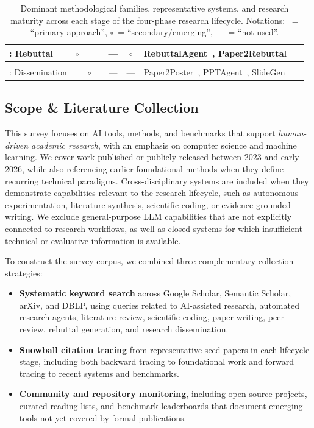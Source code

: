 \documentclass{llmxive}
\providecommand{\cmark}{\ding{51}}
\providecommand{\pmark}{$\circ$}
\providecommand{\xmark}{---}
\providecommand{\levelbadge}[2]{  \tcbox[on line, nobeforeafter, tcbox raise base,
         boxsep=0pt, left=2pt, right=2pt, top=0.5pt, bottom=0.5pt,
         arc=1.5pt, boxrule=0.3pt,
         colback=#1!15, colframe=#1!70]    {\scriptsize\bfseries\sffamily#2}}
\providecommand{\Sseven}{\texorpdfstring{\levelbadge{S7color}{S7}}{S7}\xspace}
\providecommand{\Seight}{\texorpdfstring{\levelbadge{S8color}{S8}}{S8}\xspace}
\begin{document}
\begin{table}[!t]
\begin{tabular}{l|ccccc|l|c}
\Sseven: Rebuttal           & \pmark & \cmark & \cmark & \xmark & \pmark & RebuttalAgent~\cite{rebuttalagent2026}, Paper2Rebuttal~\cite{paper2rebuttal2026}                                             &  \\
\midrule
\rowcolor{P4color!8}
\multicolumn{8}{l}{\textit{\textbf{Phase~4: Dissemination}}} \\
\Seight: Dissemination      & \cmark & \pmark & \cmark & \xmark & \xmark & Paper2Poster~\cite{paper2poster2025}, PPTAgent~\cite{pptagent2025}, SlideGen~\cite{slidegen2025}                             &  \\
\bottomrule
\end{tabular}
\caption{Dominant methodological families, representative systems, and research maturity across each stage of the four-phase research lifecycle. Notations: \cmark~= ``primary approach'', \pmark~= ``secondary/emerging'', \xmark~= ``not used''.}
\end{table}




\subsection{Scope \& Literature Collection}
\label{sec:scope}

This survey focuses on AI tools, methods, and benchmarks that support \emph{human-driven academic research}, with an emphasis on computer science and machine learning. We cover work published or publicly released between 2023 and early 2026, while also referencing earlier foundational methods when they define recurring technical paradigms. Cross-disciplinary systems are included when they demonstrate capabilities relevant to the research lifecycle, such as autonomous experimentation, literature synthesis, scientific coding, or evidence-grounded writing. We exclude general-purpose LLM capabilities that are not explicitly connected to research workflows, as well as closed systems for which insufficient technical or evaluative information is available.

To construct the survey corpus, we combined three complementary collection strategies:
\begin{itemize}
    \item \textbf{Systematic keyword search} across Google Scholar, Semantic Scholar, arXiv, and DBLP, using queries related to AI-assisted research, automated research agents, literature review, scientific coding, paper writing, peer review, rebuttal generation, and research dissemination.

    \item \textbf{Snowball citation tracing} from representative seed papers in each lifecycle stage, including both backward tracing to foundational work and forward tracing to recent systems and benchmarks.

    \item \textbf{Community and repository monitoring}, including open-source projects, curated reading lists, and benchmark leaderboards that document emerging tools not yet covered by formal publications.
\end{itemize}
\end{document}

